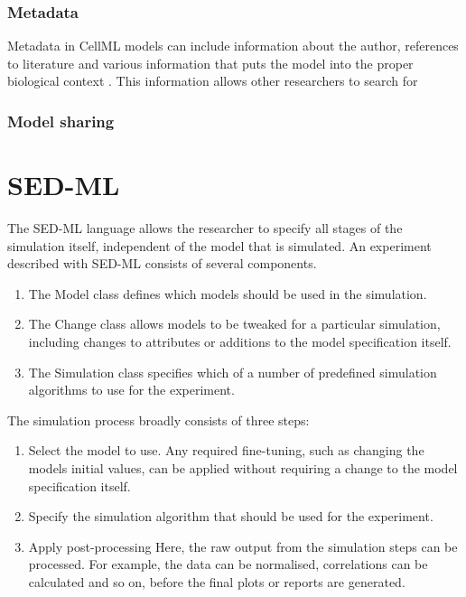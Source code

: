 \documentclass[\rootfolder/main.tex]{subfiles}
\begin{document}
\subsubsection{Metadata}

Metadata in CellML models can include information about the author, references to literature and various information that puts the model into the proper biological context \cite{cuellar2003}.
This information allows other researchers to search for

\subsubsection{Model sharing}

\section{SED-ML}

The SED-ML language allows the researcher to specify all stages of the simulation itself, independent of the model that is simulated.
An experiment described with SED-ML consists of several components.

\begin{enumerate}
    \item The Model class defines which models should be used in the simulation.
    \item The Change class allows models to be tweaked for a particular simulation, including changes to attributes or additions to the model specification itself.
    \item The Simulation class specifies which of a number of predefined simulation algorithms to use for the experiment. \cite{sedml-specification}
\end{enumerate}

The simulation process broadly consists of three steps:

\begin{enumerate}
    \item Select the model to use. Any required fine-tuning, such as changing the models initial values, can be applied without requiring a change to the model specification itself.
    \item Specify the simulation algorithm that should be used for the experiment.
    \item Apply post-processing
        Here, the raw output from the simulation steps can be processed. For example, the data can be normalised,
        correlations can be calculated and so on, before the final plots or reports are generated.
\end{enumerate}
\end{document}
